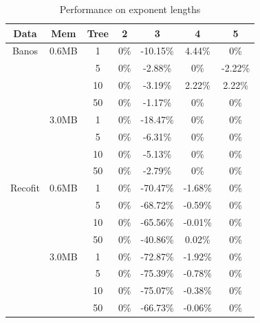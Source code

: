 \documentclass[conference]{IEEEtran}
\begin{document}
\begin{table}[htbp]
    \caption{Performance on exponent lengths}
    \begin{center}
        \begin{tabular}{|c|c|c|c|c|c|c|}
            \hline
            \textbf{Data} & \textbf{Mem} & \textbf{Tree} & \textbf{2} & \textbf{3} & \textbf{4} & \textbf{5} \\
            \hline
            Banos         & 0.6MB        & 1             & 0\%        & -10.15\%   & 4.44\%     & 0\%        \\
            \cline{3-7}   &              & 5             & 0\%        & -2.88\%    & 0\%        & -2.22\%    \\
            \cline{3-7}   &              & 10            & 0\%        & -3.19\%    & 2.22\%     & 2.22\%     \\
            \cline{3-7}   &              & 50            & 0\%        & -1.17\%    & 0\%        & 0\%        \\
            \cline{2-7}   & 3.0MB        & 1             & 0\%        & -18.47\%   & 0\%        & 0\%        \\
            \cline{3-7}   &              & 5             & 0\%        & -6.31\%    & 0\%        & 0\%        \\
            \cline{3-7}   &              & 10            & 0\%        & -5.13\%    & 0\%        & 0\%        \\
            \cline{3-7}   &              & 50            & 0\%        & -2.79\%    & 0\%        & 0\%        \\
            \hline
            Recofit       & 0.6MB        & 1             & 0\%        & -70.47\%   & -1.68\%    & 0\%        \\
            \cline{3-7}   &              & 5             & 0\%        & -68.72\%   & -0.59\%    & 0\%        \\
            \cline{3-7}   &              & 10            & 0\%        & -65.56\%   & -0.01\%    & 0\%        \\
            \cline{3-7}   &              & 50            & 0\%        & -40.86\%   & 0.02\%     & 0\%        \\
            \cline{2-7}   & 3.0MB        & 1             & 0\%        & -72.87\%   & -1.92\%    & 0\%        \\
            \cline{3-7}   &              & 5             & 0\%        & -75.39\%   & -0.78\%    & 0\%        \\
            \cline{3-7}   &              & 10            & 0\%        & -75.07\%   & -0.38\%    & 0\%        \\
            \cline{3-7}   &              & 50            & 0\%        & -66.73\%   & -0.06\%    & 0\%        \\
            \hline
        \end{tabular}
        \label{tab3}
    \end{center}
\end{table}
\end{document}
